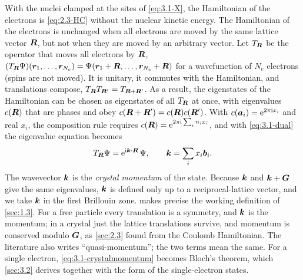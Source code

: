 With the nuclei clamped at the sites of \cref{eq:3.1-X}, the Hamiltonian of the electrons is \cref{eq:2.3-HC} without the nuclear kinetic energy. The Hamiltonian of the electrons is unchanged when all electrons are moved by the same lattice vector $\bm{R}$, but not when they are moved by an arbitrary vector. Let $T_{\bm{R}}$ be the operator that moves all electrons by $\bm{R}$, $(T_{\bm{R}}\Psi)(\bm{r}_1, \dots, \bm{r}_{N_e}) = \Psi(\bm{r}_1 + \bm{R}, \dots, \bm{r}_{N_e} + \bm{R})$ for a wavefunction of $N_e$ electrons (spins are not moved). It is unitary, it commutes with the Hamiltonian, and translations compose, $T_{\bm{R}}T_{\bm{R}'} = T_{\bm{R} + \bm{R}'}$. As a result, the eigenstates of the Hamiltonian can be chosen as eigenstates of all $T_{\bm{R}}$ at once, with eigenvalues $c(\bm{R})$ that are phases and obey $c(\bm{R} + \bm{R}') = c(\bm{R})c(\bm{R}')$. With $c(\bm{a}_i) = \mathrm{e}^{2\pi\mathrm{i} x_i}$ and real $x_i$, the composition rule requires $c(\bm{R}) = \mathrm{e}^{2\pi\mathrm{i}\sum_in_ix_i}$, and with \cref{eq:3.1-dual} the eigenvalue equation becomes
\begin{equation}
  T_{\bm{R}}\Psi = \mathrm{e}^{\mathrm{i}\bm{k}\cdot\bm{R}}\,\Psi, \qquad \bm{k} = \sum_ix_i\bm{b}_i .
  \label{eq:3.1-crystalmomentum}
\end{equation}
The wavevector $\bm{k}$ is the \emph{crystal momentum} of the state. Because $\bm{k}$ and $\bm{k} + \bm{G}$ give the same eigenvalues, $\bm{k}$ is defined only up to a reciprocal-lattice vector, and we take $\bm{k}$ in the first Brillouin zone.  makes precise the working definition of \cref{sec:1.3}. For a free particle every translation is a symmetry, and $\bm{k}$ is the momentum; in a crystal just the lattice translations survive, and momentum is conserved modulo $\bm{G}$, as \cref{sec:2.3} found from the Coulomb Hamiltonian. The literature also writes ``quasi-momentum''; the two terms mean the same. For a single electron, \cref{eq:3.1-crystalmomentum} becomes Bloch's theorem, which \cref{sec:3.2} derives together with the form of the single-electron states.

